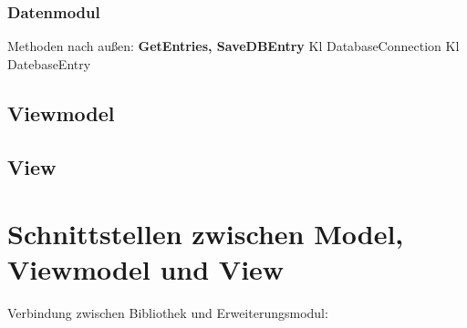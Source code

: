 \documentclass[a4paper,12pt]{article}
\begin{document}
\subsubsection{Datenmodul}
Methoden nach außen: \textbf{GetEntries, SaveDBEntry}
Kl DatabaseConnection
Kl DatebaseEntry
 
\subsection{Viewmodel}
\subsection{View}


\section{Schnittstellen zwischen Model, Viewmodel und View}
Verbindung zwischen Bibliothek und Erweiterungsmodul:
\end{document}
